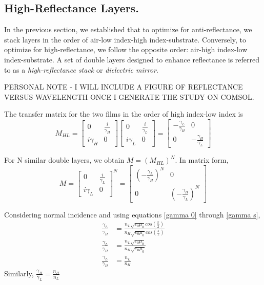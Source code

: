 \subsection{High-Reflectance Layers.}
In the previous section, we established that to optimize for anti-reflectance, we stack layers in the order of air-low index-high index-substrate. Conversely, to optimize for high-reflectance, we follow the opposite order: air-high index-low index-substrate. A set of double layers designed to enhance reflectance is referred to as a \emph{high-reflectance stack} or \emph{dielectric mirror}. %

PERSONAL NOTE - I WILL INCLUDE A FIGURE OF REFLECTANCE VERSUS WAVELENGTH ONCE I GENERATE THE STUDY ON COMSOL.

The transfer matrix for the two films in the order of high index-low index is
    \[
      M_{HL} = 
            \begin{bmatrix}
            0 & \frac{i}{\gamma_H} \\
            i\gamma_H & 0
            \end{bmatrix}
            \begin{bmatrix}
            0 & \frac{i}{\gamma_L} \\
            i\gamma_L & 0
            \end{bmatrix} =
                    \begin{bmatrix}
                        -\frac{\gamma_L}{\gamma_H} & 0  \\
                        0 & -\frac{\gamma_H}{\gamma_L}
                    \end{bmatrix}
    \]
    
For N similar double layers, we obtain $M = (M_{HL})^N$. In matrix form,
    \[
      M = 
            \begin{bmatrix}
            0 & \frac{i}{\gamma_L} \\
            i\gamma_L & 0
            \end{bmatrix}^N =
                \begin{bmatrix}
                    \left(-\frac{\gamma_L}{\gamma_H}\right)^N & 0  \\
                    0 & \left(-\frac{\gamma_H}{\gamma_L}\right)^N
                \end{bmatrix}
    \]

Considering normal incidence and using equations \ref{gamma 0} through \ref{gamma s},
    \begin{align*}
        \frac{\gamma_L}{\gamma_H} &= \frac{n_L\sqrt{\varepsilon_0\mu_0}cos(\frac{\pi}{2})}{n_H\sqrt{\varepsilon_0\mu_0}cos(\frac{\pi}{2})}\\
        \frac{\gamma_L}{\gamma_H} &= \frac{n_L\sqrt{\varepsilon_0\mu_0}}{n_H\sqrt{\varepsilon_0\mu_0}}  \\
        \frac{\gamma_L}{\gamma_H} &= \frac{n_L}{n_H}
    \end{align*}
Similarly, $\frac{\gamma_H}{\gamma_L} = \frac{n_H}{n_L}$

